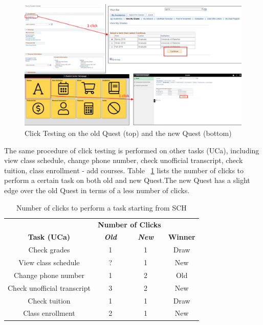 \documentclass[conference]{IEEEtran}
\begin{document}
\begin{figure}[htdp]
\centering
  \includegraphics[width=1\columnwidth]{click_grades.png}
  \caption{Click Testing on the old Quest (top) and the new Quest (bottom)}
  \label{fig:figure7}
\end{figure}

The same procedure of click testing is performed on other tasks (UCa), including view class schedule, change phone number, check unofficial transcript, check tuition, class enrollment - add courses. Table ~\ref{tab1} lists the number of clicks to perform a certain task on both old and new Quest.The new Quest has a slight edge over the old Quest in terms of a less number of clicks.

\begin{table}[htbp]
\caption{Number of clicks to perform a task starting from SCH}
\begin{center}
\begin{tabular}{|c|c|c|c|}
\hline
\textbf{}&\multicolumn{2}{|c|}{\textbf{Number of Clicks}}&\textbf{} \\
\cline{2-3} 
\textbf{Task (UCa)} & \textbf{\textit{Old}}& \textbf{\textit{New}} & \textbf{Winner} \\
\hline
Check grades & 1 & 1 & Draw \\ \hline
View class schedule & ? & 1 & New \\ \hline
Change phone number & 1 & 2 & Old \\ \hline
Check unofficial transcript & 3 & 2 & New \\ \hline
Check tuition & 1 & 1 & Draw \\ \hline
Class enrollment & 2 & 1 & New  \\ \hline
\end{tabular}
\label{tab1}
\end{center}
\end{table}
\end{document}

